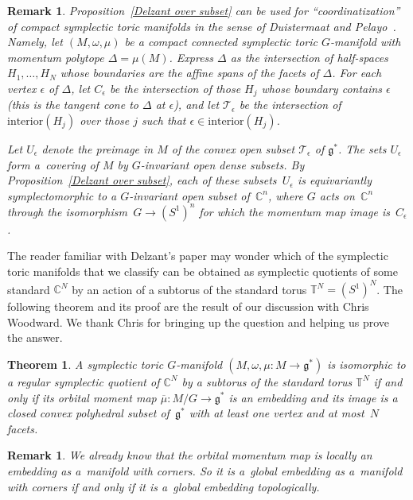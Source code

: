 \documentclass[10pt,a4paper]{amsart}
\numberwithin{equation}{section}
\newtheorem{Theorem}[Lemma]{Theorem}
\newtheorem{Remark}[Lemma]{Remark}
\begin{document}
\begin{Remark}
  Proposition~\ref{Delzant over subset} can be used for
  ``coordinatization'' of compact symplectic toric manifolds in the
  sense of Duistermaat and Pelayo~\cite{DP}. Namely, let
  $(M,\omega,\mu)$ be a compact connected symplectic toric
  $G$-manifold with momentum polytope $\Delta = \mu(M)$.  Express
  $\Delta$ as the intersection of half-spaces $H_1,\ldots,H_N$ whose
  boundaries are the af\/f\/ine spans of the facets of $\Delta$.  For each
  vertex $\epsilon$ of $\Delta$, let $C_\epsilon$ be the intersection of those
  $H_j$ whose boundary contains $\epsilon$ (this is the tangent cone to
  $\Delta$ at $\epsilon$), and let ${\mathcal T}_\epsilon$ be the intersection of
  $\text{interior}(H_j)$ over those $j$ such that $\epsilon \in
  \text{interior}(H_j)$.

Let $U_\epsilon$ denote the preimage in $M$ of the convex open subset
${\mathcal T}_\epsilon$ of ${\mathfrak g}^*$.
The sets $U_\epsilon$ form a~covering of $M$ by $G$-invariant open dense subsets.
By Proposition~\ref{Delzant over subset},
each of these sub\-sets~$U_\epsilon$ is equivariantly symplectomorphic
to a $G$-invariant open subset of~${\mathbb C}^n$,
where $G$ acts on~${\mathbb C}^n$ through the isomorphism~$G \to (S^1)^n$
for which the momentum map image is~$C_\epsilon$.
\end{Remark}

The reader familiar with Delzant's paper may wonder which of the
symplectic toric manifolds that we classify can be obtained as
symplectic quotients of some standard ${\mathbb C}^N$ by an action of a
subtorus of the standard torus ${\mathbb T}^N = (S^1)^N$.
The following theorem and its proof are the result of our discussion
with Chris Woodward.  We thank Chris for bringing up the question
and helping us prove the answer.

\begin{Theorem} \label{reduction of CN}
  A symplectic toric $G$-manifold $(M,\omega,\mu \colon M\to {\mathfrak g}^*)$ is
  isomorphic to a regular symplectic quotient of ${\mathbb C}^N$ by a subtorus of the
  standard torus ${\mathbb T}^N$ if and only if
  its orbital moment map $\overline{\mu} \colon M/G \to {\mathfrak g}^*$
  is an embedding and its image is a closed convex
  polyhedral subset of~${\mathfrak g}^*$ with at least one vertex
  and at most~$N$  facets.
\end{Theorem}

\begin{Remark}
We already know that the orbital momentum map is locally
an embedding as a~manifold with corners.
So it is a~global embedding as a~manifold with corners
if and only if it is a~global embedding topologically.
\end{Remark}
\end{document}
